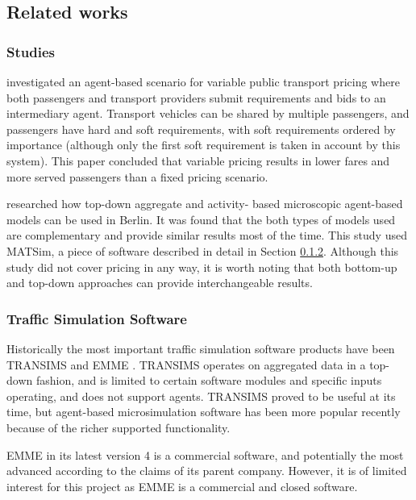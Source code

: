 \subsection{Related works}
\label{sec:literature:related}

\subsubsection{Studies}

\textcite{Emele2013pricing+rural} investigated an agent-based scenario for
variable public transport pricing where both passengers and transport providers
submit requirements and bids to an intermediary agent. Transport vehicles can
be shared by multiple passengers, and passengers have hard and soft
requirements, with soft requirements ordered by importance (although only the
first soft requirement is taken in account by this system). This paper
concluded that variable pricing results in lower fares and more served
passengers than a fixed pricing scenario.

\textcite{Neumann2011berlin} researched how top-down aggregate and activity-
based microscopic agent-based models can be used in Berlin. It was found that
the both types of models used are complementary and provide similar results
most of the time. This study used MATSim, a piece of software described in
detail in Section \ref{sec:literature:related:simulation}. Although this study
did not cover pricing in any way, it is worth noting that both bottom-up and
top-down approaches can provide interchangeable results.


\subsubsection{Traffic Simulation Software}
\label{sec:literature:related:simulation}

Historically the most important traffic simulation software products have been
TRANSIMS \parencite{Smith1995taxi+transims} and EMME
\parencite{Gao2010taxi+comparison}. TRANSIMS operates on aggregated data in a
top-down fashion, and is limited to certain software modules and specific
inputs operating, and does not support agents. TRANSIMS proved to be useful at
its time, but agent-based microsimulation software has been more popular
recently because of the richer supported functionality.
\parencite{Bernhardt2007taxi+agent}

EMME in its latest version 4 is a commercial software, and potentially the most
advanced according to the claims of its parent company. However, it is of
limited interest for this project as EMME is a commercial and closed software.
\parencite{Inro2014emme}

